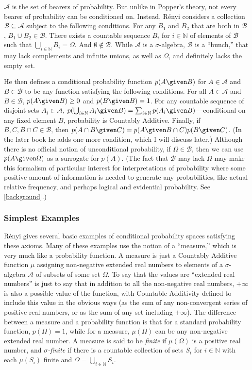 $\mathcal{A}$ is the set of bearers of probability. But unlike in Popper's theory, not every bearer of probability can be conditioned on. Instead, R\'{e}nyi considers a collection $\mathcal{B}\subseteq\mathcal{A}$ subject to the following conditions. For any $B_1$ and $B_2$ that are both in $\mathcal{B}$, $B_1\cup B_2\in\mathcal{B}$. There exists a countable sequence $B_i$ for $i\in\mathbb{N}$ of elements of $\mathcal{B}$ such that $\bigcup_{i\in\mathbb{N}}B_i=\Omega$. And $\emptyset\not\in\mathcal{B}$. While $\mathcal{A}$ is a $\sigma$-algebra, $\mathcal{B}$ is a ``bunch,'' that may lack complements and infinite unions, as well as $\Omega$, and definitely lacks the empty set.

He then defines a conditional probability function $p(A \given B)$ for $A\in\mathcal{A}$ and $B\in\mathcal{B}$ to be any function satisfying the following conditions. For all $A\in\mathcal{A}$ and $B\in\mathcal{B}$, $p(A \given B)\geq 0$ and $p(B \given B)=1$. For any countable sequence of disjoint sets $A_i\in\mathcal{A}$, $p(\bigcup_{i\in\mathbb{N}}A_i \given B)={\sum_{i\in\mathbb{N}}p(A_i \given B)}$---conditional on any fixed element $B$, probability is Countably Additive. Finally, if $B,C,B\cap C\in \mathcal{B}$, then $p(A\cap B \given C)=p(A \given B\cap C)p(B \given C)$. (In the later book he adds one more condition, which I will discuss later.) Although there is no official notion of unconditional probability, if $\Omega\in\mathcal{B}$, then we can use $p(A \given \Omega)$ as a surrogate for $p(A)$. (The fact that $\mathcal{B}$ may lack $\Omega$ may make this formalism of particular interest for interpretations of probability where some positive amount of information is needed to generate any probabilities, like actual relative frequency, and perhaps logical and evidential probability. See \autoref{background}.)

\subsubsection{Simplest Examples}\label{simple}

R\'{e}nyi gives several basic examples of conditional probability spaces satisfying these axioms. Many of these examples use the notion of a ``measure,'' which is very much like a probability function. A measure is just a Countably Additive function $\mu$ assigning non-negative extended real numbers to elements of a $\sigma$-algebra $\mathcal{A}$ of subsets of some set $\Omega$. To say that the values are ``extended real numbers'' is just to say that in addition to all the non-negative real numbers, $+\infty$ is also a possible value of the function, with Countable Additivity defined to include this value in the obvious ways (as the sum of any non-convergent series of positive real numbers, or as the sum of any set including $+\infty$). The difference between a measure and a probability function is that for a standard probability function, $p(\Omega)=1$, while for a measure, $\mu(\Omega)$ can be any non-negative extended real number. A measure is said to be \textit{finite} if $\mu(\Omega)$ is a positive real number, and \textit{$\sigma$-finite} if there is a countable collection of sets $S_i$ for $i\in\mathbb{N}$ with each $\mu(S_i)$ finite and $\Omega=\bigcup_{i\in\mathbb{N}}S_i$.

